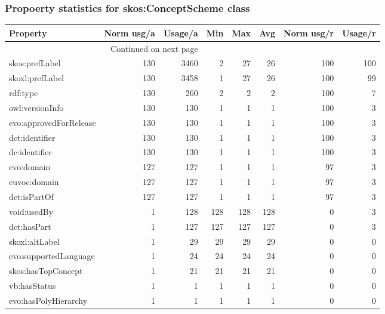 \documentclass[10pt,a4paper,titlepage,final]{article}
\begin{document}
\subsubsection{Propoerty statistics for skos:ConceptScheme class}
\begin{longtable}{lrrrrrrr}
\toprule
               Property &  Norm usg/a &  Usage/a &  Min &  Max &  Avg &  Norm usg/r &  Usage/r \\
\midrule
\endhead
\midrule
\multicolumn{3}{r}{{Continued on next page}} \\
\midrule
\endfoot

\bottomrule
\endlastfoot
         skos:prefLabel &         130 &     3460 &    2 &   27 &   26 &         100 &      100 \\
        skoxl:prefLabel &         130 &     3458 &    1 &   27 &   26 &         100 &       99 \\
               rdf:type &         130 &      260 &    2 &    2 &    2 &         100 &        7 \\
        owl:versionInfo &         130 &      130 &    1 &    1 &    1 &         100 &        3 \\
 evo:approvedForRelease &         130 &      130 &    1 &    1 &    1 &         100 &        3 \\
         dct:identifier &         130 &      130 &    1 &    1 &    1 &         100 &        3 \\
          dc:identifier &         130 &      130 &    1 &    1 &    1 &         100 &        3 \\
             evo:domain &         127 &      127 &    1 &    1 &    1 &          97 &        3 \\
           euvoc:domain &         127 &      127 &    1 &    1 &    1 &          97 &        3 \\
           dct:isPartOf &         127 &      127 &    1 &    1 &    1 &          97 &        3 \\
            void:usedBy &           1 &      128 &  128 &  128 &  128 &           0 &        3 \\
            dct:hasPart &           1 &      127 &  127 &  127 &  127 &           0 &        3 \\
         skoxl:altLabel &           1 &       29 &   29 &   29 &   29 &           0 &        0 \\
  evo:supportedLanguage &           1 &       24 &   24 &   24 &   24 &           0 &        0 \\
     skos:hasTopConcept &           1 &       21 &   21 &   21 &   21 &           0 &        0 \\
           vb:hasStatus &           1 &        1 &    1 &    1 &    1 &           0 &        0 \\
   evo:hasPolyHierarchy &           1 &        1 &    1 &    1 &    1 &           0 &        0 \\
\end{longtable}
\end{document}
